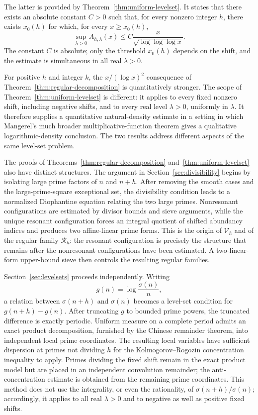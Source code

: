 \documentclass[11pt,reqno]{amsart}
\numberwithin{equation}{section}
\theoremstyle{plain}
\theoremstyle{definition}
\theoremstyle{remark}
\begin{document}
The latter is provided by Theorem~\ref{thm:uniform-levelset}. It states that there exists an absolute constant $C>0$ such that, for every nonzero integer $h$, there exists $x_0(h)$ for which, for every $x\ge x_0(h)$,
\[
\sup_{\lambda>0}A_{h,\lambda}(x)
\le
C\frac{x}{\sqrt{\log\log\log x}}.
\]
The constant $C$ is absolute; only the threshold $x_0(h)$ depends on the shift, and the estimate is simultaneous in all real $\lambda>0$.

For positive $h$ and integer $k$, the $x/(\log x)^2$ consequence of
Theorem~\ref{thm:regular-decomposition} is quantitatively stronger. The scope of Theorem~\ref{thm:uniform-levelset} is different: it applies to every fixed nonzero shift, including negative shifts, and to every real level $\lambda>0$, uniformly in $\lambda$. It therefore supplies a quantitative natural-density estimate in a setting in which Mangerel's much broader multiplicative-function theorem gives a qualitative logarithmic-density conclusion. The two results address different aspects of the same level-set problem.

The proofs of Theorems~\ref{thm:regular-decomposition} and~\ref{thm:uniform-levelset} also have distinct structures. The argument in Section~\ref{sec:divisibility} begins by isolating large prime factors of $n$ and $n+h$. After removing the smooth cases and the large-prime-square exceptional
set, the divisibility condition leads to a normalized Diophantine equation
relating the two large primes. Nonresonant configurations are estimated by divisor bounds and sieve arguments, while the unique resonant configuration forces an integral quotient of shifted abundancy indices and produces two affine-linear prime forms. This is the origin of $\mathcal V_h$ and of the regular family $\mathcal R_h$: the resonant configuration is precisely the structure that remains after the nonresonant configurations have been estimated. A two-linear-form upper-bound sieve then controls the resulting regular families.

Section~\ref{sec:levelsets} proceeds independently. Writing
\[
g(n)=\log\frac{\sigma(n)}{n},
\]
a relation between $\sigma(n+h)$ and $\sigma(n)$ becomes a level-set condition for $g(n+h)-g(n)$. After truncating $g$ to bounded prime powers, the truncated difference is exactly periodic. Uniform measure on a complete period admits an exact product decomposition, furnished by the Chinese remainder theorem, into independent local prime coordinates. The resulting local variables have sufficient dispersion at primes not dividing $h$ for the Kolmogorov--Rogozin concentration inequality to apply. Primes dividing the fixed shift remain in the exact product model but are placed in an independent convolution remainder; the anti-concentration
estimate is obtained from the remaining prime coordinates. This method does not use the integrality, or even the rationality, of $\sigma(n+h)/\sigma(n)$; accordingly, it applies to all real $\lambda>0$ and to negative as well as positive fixed shifts.
\end{document}

